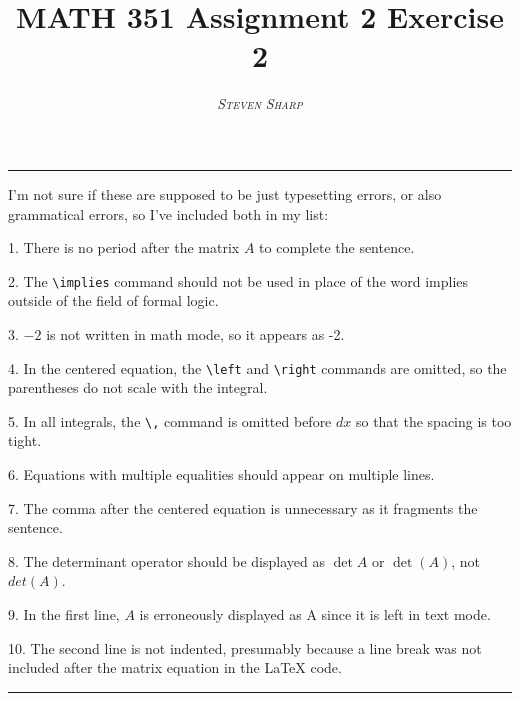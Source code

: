 \documentclass[10pt]{article}
\title{MATH 351 Assignment 2 Exercise 2}
\author{\textsc{\textit{Steven Sharp}}}
\date{}
\begin{document}
\maketitle

\thispagestyle{empty}

\begin{center}
\rule{\textwidth}{0.5pt}
\end{center}

\setlength{\parindent}{1.5eM} I'm not sure if these are supposed to be just typesetting errors, or also grammatical errors, so I've included both in my list:

\setlength{\parindent}{0eM} 1. There is no period after the matrix $A$ to complete the sentence.

2. The \verb!\implies! command should not be used in place of the word implies outside of the field of formal logic.

3. $-2$ is not written in math mode, so it appears as -2.

4. In the centered equation, the \verb!\left! and \verb!\right! commands are omitted, so the parentheses do not scale with the integral.

5. In all integrals, the \verb!\,! command is omitted before $dx$ so that the spacing is too tight.

6. Equations with multiple equalities should appear on multiple lines.

7. The comma after the centered equation is unnecessary as it fragments the sentence.

8. The determinant operator should be displayed as $\det A$ or $\det(A)$, not $det(A)$.

9. In the first line, $A$ is erroneously displayed as A since it is left in text mode.

10. The second line is not indented, presumably because a line break was not included after the matrix equation in the \LaTeX{} code.

\begin{center}
\rule{\textwidth}{0.5pt}
\end{center}
\end{document}
